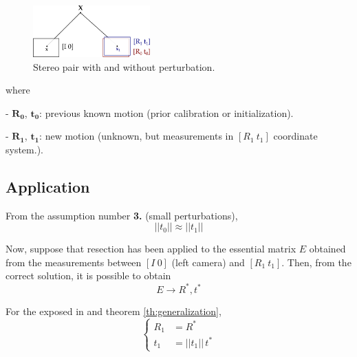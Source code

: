 \begin{figure}[!htbp]
 \centering
 \includegraphics[width=0.4\textwidth]{images/stereo01.pdf}
 \caption{Stereo pair with and without perturbation.}
 \label{fig:stereo}
\end{figure}
where
\begin{itemize*}
 \item[-] {\color{red} $\mathbf{R_0}$, $\mathbf{t_0}$}: previous known motion (prior calibration or initialization).

 \item[-] {\color{blue} $\mathbf{R_1}$, $\mathbf{t_1}$}: new motion (unknown, but measurements in $[R_1~t_1]$ coordinate system.).
\end{itemize*}


\subsection{Application}
From the assumption number \textbf{3.} (small perturbations),
\begin{equation}
\label{eq:aprox}
 ||t_0|| \approx ||t_1||
\end{equation}

\noindent
Now, suppose that resection has been applied to the essential matrix $E$ obtained from the measurements between $[I~0]$ (left camera) and $[R_1~t_1]$. Then, from the correct solution, it is possible to obtain
\begin{equation}
 E \rightarrow R^*, t^*
\end{equation}

\noindent
For the exposed in \cite{HZ2} and %
theorem \ref{th:generalization},
\begin{equation}
\left\{
  \begin{align}
  R_1 & = R^* \\
  t_1 & = ||t_1||\,t^*
  \end{align}
\right.
\end{equation}

